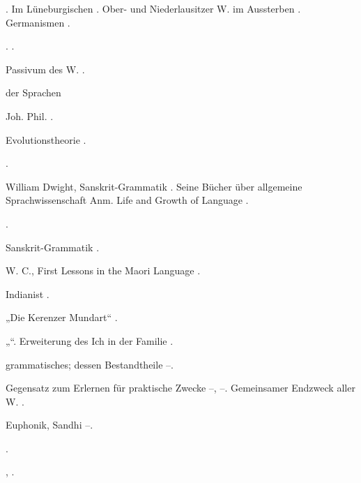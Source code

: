 \begin{register}
 \pageref{sp.54}. Im Lüneburgischen \pageref{sp.146}. Ober- und Niederlausitzer W. im Aussterben \pageref{sp.146}. Germanismen \pageref{sp.270}.


 \pageref{sp.103}.  \pageref{sp.318}.

 Passivum des W. \pageref{sp.102}.

 der Sprachen 

 Joh. Phil. \pageref{sp.26}.


 Evolutionstheorie \pageref{sp.216}.

 \pageref{sp.193}.

 William Dwight, Sanskrit-Grammatik \pageref{sp.34}. Seine Bücher über allgemeine Sprachwissenschaft \pageref{sp.52} Anm. Life and Growth of Language \pageref{sp.136}.

 \pageref{sp.103}.


 Sanskrit-Grammatik \pageref{sp.26}.

 W. C., First Lessons in the Maori Language \pageref{sp.463}.

 Indianist \pageref{sp.31}.

 „Die Kerenzer Mundart“ \pageref{sp.33}.

„“. Erweiterung des Ich in der Familie \pageref{sp.306}.

 grammatisches; dessen Bestandtheile \pageref{sp.84}–\pageref{sp.86}.

 Gegensatz zum Erlernen für praktische Zwecke \pageref{sp.7}–\pageref{sp.8}, \pageref{sp.17}–\pageref{sp.18}. Gemeinsamer Endzweck aller W. \pageref{sp.13}.



 Euphonik, Sandhi \pageref{sp.197}–\pageref{sp.205}.

 \pageref{sp.103}.

 \pageref{sp.150}, \pageref{sp.282}. 


\end{register}
